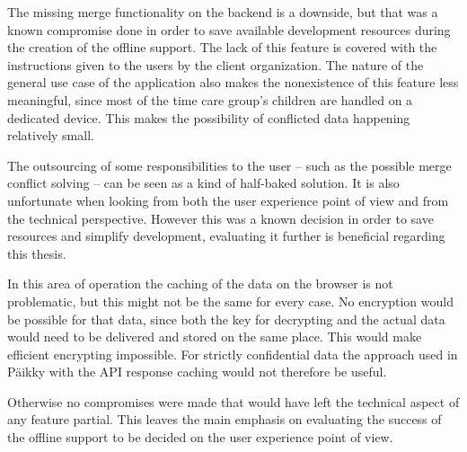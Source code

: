 The missing merge functionality on the backend is a downside, but that was a known compromise done in order to save available development resources during the creation of the offline support. The lack of this feature is covered with the instructions given to the users by the client organization. The nature of the general use case of the application also makes the nonexistence of this feature less meaningful, since most of the time care group's children are handled on a dedicated device. This makes the possibility of conflicted data happening relatively small.

The outsourcing of some responsibilities to the user -- such as the possible merge conflict solving -- can be seen as a kind of half-baked solution. It is also unfortunate when looking from both the user experience point of view and from the technical perspective. However this was a known decision in order to save resources and simplify development, evaluating it further is beneficial regarding this thesis.

In this area of operation the caching of the data on the browser is not problematic, but this might not be the same for every case. No encryption would be possible for that data, since both the key for decrypting and the actual data would need to be delivered and stored on the same place. This would make efficient encrypting impossible. For strictly confidential data the approach used in Päikky with the API response caching would not therefore be useful. %

Otherwise no compromises were made that would have left the technical aspect of any feature partial. This leaves the main emphasis on evaluating the success of the offline support to be decided on the user experience point of view.



 

